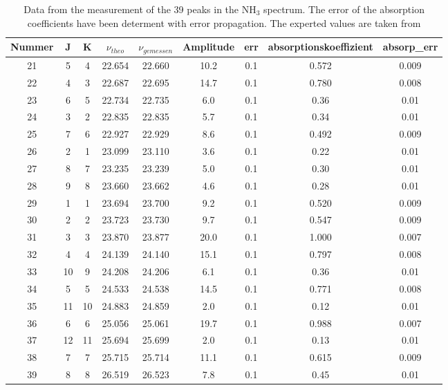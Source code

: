 \begin{table}[H]
\centering
\caption{Data from the measurement of the 39 peaks in the NH$_3$ spectrum. The error of the absorption coefficients have been determent with error propagation. The experted values are taken from \cite{examenarbeit}}
\label{tab:data_39_2}
\begin{tabular}{c|c|c|c|c|c|c|c|c}
 Nummer &   J &   K &  $\nu_{theo}$ &  $\nu_{gemessen}$ &  Amplitude &   err &  absorptionskoeffizient &  absorp\_err \\ \hline
     21 &   5 &   4 &   22.654 &       22.660 &     10.2 &  0.1 &                0.572 &    0.009 \\
     22 &   4 &   3 &   22.687 &       22.695 &     14.7 &  0.1 &                0.780 &    0.008 \\
     23 &   6 &   5 &   22.734 &       22.735 &      6.0 &  0.1 &                0.36 &    0.01 \\
     24 &   3 &   2 &   22.835 &       22.835 &      5.7 &  0.1 &                0.34 &    0.01 \\
     25 &   7 &   6 &   22.927 &       22.929 &      8.6 &  0.1 &                0.492 &    0.009 \\
     26 &   2 &   1 &   23.099 &       23.110 &      3.6 &  0.1 &                0.22 &    0.01 \\
     27 &   8 &   7 &   23.235 &       23.239 &      5.0 &  0.1 &                0.30 &    0.01 \\
     28 &   9 &   8 &   23.660 &       23.662 &      4.6 &  0.1 &                0.28 &    0.01 \\
     29 &   1 &   1 &   23.694 &       23.700 &      9.2 &  0.1 &                0.520 &    0.009 \\
     30 &   2 &   2 &   23.723 &       23.730 &      9.7 &  0.1 &                0.547 &    0.009 \\
     31 &   3 &   3 &   23.870 &       23.877 &     20.0 &  0.1 &                1.000 &    0.007 \\
     32 &   4 &   4 &   24.139 &       24.140 &     15.1 &  0.1 &                0.797 &    0.008 \\
     33 &  10 &   9 &   24.208 &       24.206 &      6.1 &  0.1 &                0.36 &    0.01 \\
     34 &   5 &   5 &   24.533 &       24.538 &     14.5 &  0.1 &                0.771 &    0.008 \\
     35 &  11 &  10 &   24.883 &       24.859 &      2.0 &  0.1 &                0.12 &    0.01 \\
     36 &   6 &   6 &   25.056 &       25.061 &     19.7 &  0.1 &                0.988 &    0.007 \\
     37 &  12 &  11 &   25.694 &       25.699 &      2.0 &  0.1 &                0.13 &    0.01 \\
     38 &   7 &   7 &   25.715 &       25.714 &     11.1 &  0.1 &                0.615 &    0.009 \\
     39 &   8 &   8 &   26.519 &       26.523 &      7.8 &  0.1 &                0.45 &    0.01 \\
\end{tabular}
\end{table}


